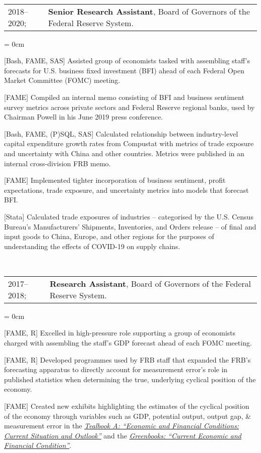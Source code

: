 \documentclass[a4paper, 10pt]{article}
\begin{document}
  ~\begin{tabular}{ll}
    2018--2020; & \textbf{Senior Research Assistant}, Board of Governors of the Federal Reserve System.
  \end{tabular}
  \begin{compactitem}\parskip = 0cm
    \item {[Bash, FAME, SAS]} Assisted group of economists tasked with assembling staff's forecasts for U.S. business fixed investment (BFI) ahead of each Federal Open Market Committee (FOMC) meeting.
    \item {[FAME]} Compiled an internal memo consisting of BFI and business sentiment survey metrics across private sectors and Federal Reserve regional banks, used by Chairman Powell in his June 2019 press conference.
    \item {[Bash, FAME, (P)SQL, SAS]} Calculated relationship between industry-level capital expenditure growth rates from Compustat with metrics of trade exposure and uncertainty with China and other countries. Metrics were published in an internal cross-division FRB memo.
    \item {[FAME]} Implemented tighter incorporation of business sentiment, profit expectations, trade exposure, and uncertainty metrics into models that forecast BFI.
    \item {[Stata]} Calculated trade exposures of industries -- categorised by the U.S. Census Bureau's Manufacturers' Shipments, Inventories, and Orders release -- of final and input goods to China, Europe, and other regions for the purposes of understanding the effects of COVID-19 on supply chains.
  \end{compactitem}
  \vspace*{1.25em}
      
  ~\begin{tabular}{ll}
    2017--2018; & \textbf{Research Assistant}, Board of Governors of the Federal Reserve System.
  \end{tabular}
  \begin{compactitem}\parskip = 0cm
    \item {[FAME, R]} Excelled in high-pressure role supporting a group of economists charged with assembling the staff's GDP forecast ahead of each FOMC meeting.
    \item {[FAME, R]} Developed programmes used by FRB staff that expanded the FRB's forecasting apparatus to directly account for measurement error's role in published statistics when determining the true, underlying cyclical position of the economy.
    \item {[FAME]} Created new exhibits highlighting the estimates of the cyclical position of the economy through variables such as GDP, potential output, output gap, \& measurement error in the \href{https://www.federalreserve.gov/monetarypolicy/fomc_historical.htm#tealbooks}{\textit{Tealbook A: ``Economic and Financial Conditions: Current Situation and Outlook''}} and the \href{https://www.federalreserve.gov/monetarypolicy/fomc_historical.htm#greenbooks}{\textit{Greenbooks: ``Current Economic and Financial Condition''}}.
  \end{compactitem}
  \vspace*{0.25em}
      
\end{document}
